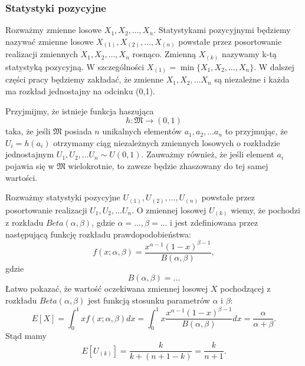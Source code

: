 \subsubsection{Statystyki pozycyjne}

Rozważmy  zmienne losowe $X_1, X_2, \dots, X_n$. Statystykami pozycyjnymi będziemy nazywać zmienne losowe  $X_{(1)}, X_{(2)}, \dots, X_{(n)}$ powstałe przez posortowanie realizacji zmiennych $X_1, X_2, \dots, X_n$ rosnąco.  Zmienną $X_{(k)}$ nazywamy k-tą statystyką pozycyjną. W szczególności $X_{(1)} = \min\{X_1, X_2, \dots, X_n \}$. W dalszej części pracy będziemy zakładać, że
zmienne $X_1, X_2, \dots X_n$ są niezależne i każda  ma rozkład jednostajny na odcinku (0,1).

Przyjmijmy, że istnieje funkcja haszująca 
\begin{equation}
    h \colon \mathfrak{M} \rightarrow (0, 1)
\end{equation}
taka, że jeśli $\mathfrak{M}$ posiada $n$ unikalnych elementów $a_1, a_2, \dots a_n$ to przyjmując, że
 $U_i = h(a_i)$ otrzymamy ciąg niezależnych zmiennych losowych o rozkładzie jednostajnym $U_1, U_2, \dots U_n \sim U(0,1)$. Zauważmy również, że jeśli element $a_i$ pojawia się w  $\mathfrak{M}$ wielokrotnie, to zawsze będzie zhaszowany do tej samej wartości.
 
Rozważmy statystyki pozycyjne  $U_{(1)}, U_{(2)}, \dots, U_{(n)}$ powstałe przez posortowanie realizacji  $U_1, U_2, \dots U_n$. O zmiennej losowej $U_{(k)}$ wiemy, że pochodzi z rozkładu $Beta(\alpha, \beta)$, gdzie $\alpha = ..., \beta = ...$   i jest zdefiniowana przez następującą funkcję rozkładu prawdopodobieństwa:
\begin{equation}
    f(x; \alpha, \beta) = \frac{x^{\alpha-1}{(1-x)}^{\beta-1}}{B(\alpha, \beta)},
\end{equation} 
gdzie $$B(\alpha, \beta) = ...$$
Łatwo pokazać, że wartość oczekiwana zmiennej losowej $X$ pochodzącej z rozkładu $Beta(\alpha, \beta)$ jest funkcją stosunku parametrów $\alpha$ i $\beta$:
\begin{equation}
    E[X] = \int_0^1 xf(x; \alpha, \beta) dx = \int_0^1 x\frac{x^{\alpha-1}{(1-x)}^{\beta-1}}{B(\alpha, \beta)} dx = \frac{\alpha}{\alpha + \beta} .
\end{equation}
Stąd mamy
\begin{equation}
\label{OS-expexcation}
E[U_{(k)}] = \frac{k}{k + (n + 1 - k)} = \frac{k}{n + 1}.
\end{equation}
 
